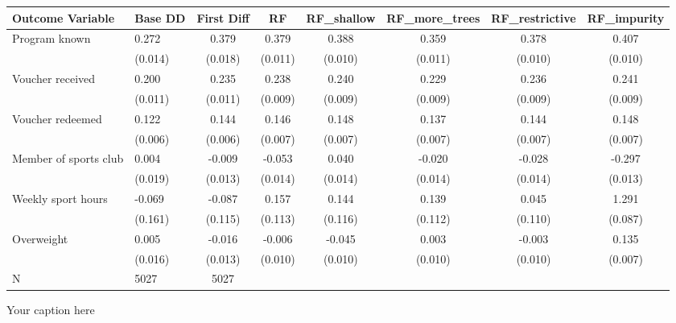 \begin{adjustbox}{angle=90}
\begin{tabular}{llcccccc}
\hline
Outcome Variable & Base DD & First Diff & RF & RF_shallow & RF_more_trees & RF_restrictive & RF_impurity \\
\hline
Program known & 0.272 & 0.379 & 0.379 & 0.388 & 0.359 & 0.378 & 0.407 \\
  & (0.014) & (0.018) & (0.011) & (0.010) & (0.011) & (0.010) & (0.010) \\
Voucher received & 0.200 & 0.235 & 0.238 & 0.240 & 0.229 & 0.236 & 0.241 \\
  & (0.011) & (0.011) & (0.009) & (0.009) & (0.009) & (0.009) & (0.009) \\
Voucher redeemed & 0.122 & 0.144 & 0.146 & 0.148 & 0.137 & 0.144 & 0.148 \\
  & (0.006) & (0.006) & (0.007) & (0.007) & (0.007) & (0.007) & (0.007) \\
Member of sports club & 0.004 & -0.009 & -0.053 & 0.040 & -0.020 & -0.028 & -0.297 \\
  & (0.019) & (0.013) & (0.014) & (0.014) & (0.014) & (0.014) & (0.013) \\
Weekly sport hours & -0.069 & -0.087 & 0.157 & 0.144 & 0.139 & 0.045 & 1.291 \\
  & (0.161) & (0.115) & (0.113) & (0.116) & (0.112) & (0.110) & (0.087) \\
Overweight & 0.005 & -0.016 & -0.006 & -0.045 & 0.003 & -0.003 & 0.135 \\
  & (0.016) & (0.013) & (0.010) & (0.010) & (0.010) & (0.010) & (0.007) \\
\hline
N & 5027 & 5027  &  &  &  &  \\
\hline
\end{tabular}
\caption{Your caption here}
\label{tab:your_label}
\end{adjustbox}